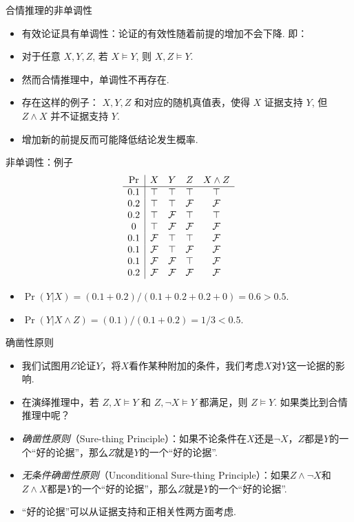 {合情推理的非单调性}
\begin{itemize}
    \item 有效论证具有单调性：论证的有效性随着前提的增加不会下降. 即：
    \item    
    对于任意 $X, Y, Z$, 若 $X\models Y$, 则 $X,Z\models Y$. 
    \item 然而合情推理中，单调性不再存在.
    \item 存在这样的例子： $X, Y, Z$ 和对应的随机真值表，使得 $X$ 证据支持 $Y$, 但 $Z\wedge X$ 并不证据支持 $Y$.
    \item 增加新的前提反而可能降低结论发生概率.
\end{itemize}


{非单调性：例子}
    \[\begin{array}{c|ccccc}
         \Pr & X & Y & Z & X \wedge Z \\ \hline
         0.1 & \top & \top & \top & \top\\
         0.2 & \top & \top & \mathcal{F} & \mathcal{F}\\
         0.2 & \top & \mathcal{F} & \top & \top\\
         0 & \top & \mathcal{F} & \mathcal{F} & \mathcal{F}\\ 
         0.1 & \mathcal{F} & \top & \top & \mathcal{F}\\ 
         0.1 & \mathcal{F} & \top & \mathcal{F} & \mathcal{F}\\
         0.1 & \mathcal{F} & \mathcal{F} & \top & \mathcal{F}\\
         0.2 & \mathcal{F} & \mathcal{F} & \mathcal{F} & \mathcal{F}\\
    \end{array}\]
    \begin{itemize}
        \item $\Pr(Y|X) = (0.1 + 0.2) / (0.1 + 0.2 + 0.2 + 0) = 0.6 > 0.5$.
        \item $\Pr(Y|X \wedge Z) = (0.1) / (0.1 + 0.2) = 1/3 < 0.5$.
    \end{itemize}
       


{确凿性原则}
\begin{itemize}
    \item 我们试图用$Z$论证$Y$，将$X$看作某种附加的条件，我们考虑$X$对$Y$这一论据的影响.
    \item  在演绎推理中，若 $Z,X\models Y$ 和 $Z,\lnot X\models Y$ 都满足，则 $Z\models Y$. 如果类比到合情推理中呢？
    \item \emph{确凿性原则}（Sure-thing Principle）：如果不论条件在$X$还是$\neg X$，$Z$都是$Y$的一个``好的论据''，那么$Z$就是$Y$的一个``好的论据''.
    \item \emph{无条件确凿性原则}（Unconditional Sure-thing Principle）：如果$Z\wedge\neg X$和$Z\wedge X$都是$Y$的一个``好的论据''，那么$Z$就是$Y$的一个``好的论据''.
    \item  ``好的论据''可以从证据支持和正相关性两方面考虑.
\end{itemize}


